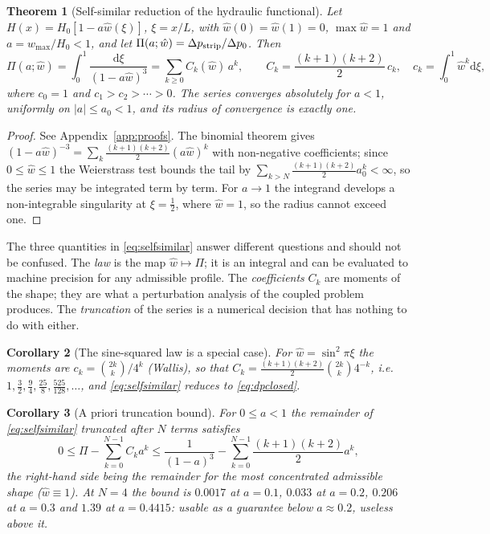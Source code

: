 \documentclass[11pt,a4paper]{article}
\newtheorem{theorem}{Theorem}[section]
\newtheorem{corollary}[theorem]{Corollary}
\newcommand{\dd}{\mathrm{d}}
\begin{document}
\begin{theorem}[Self-similar reduction of the hydraulic functional]
\label{thm:selfsimilar}
Let $H(x)=H_0[1-a\hat w(\xi)]$, $\xi=x/L$, with $\hat w(0)=\hat w(1)=0$, $\max\hat w=1$ and
$a=w_{\max}/H_0<1$, and let $\Pi(a;\hat w)=\Delta p_{\rm strip}/\Delta p_0$. Then
\begin{equation}
\Pi(a;\hat w)=\int_0^1\frac{\dd\xi}{(1-a\hat w)^3}
=\sum_{k\ge0}C_k(\hat w)\,a^k,\qquad
C_k=\frac{(k+1)(k+2)}{2}\,c_k,\quad c_k=\int_0^1\hat w^k\dd\xi ,
\label{eq:selfsimilar}
\end{equation}
where $c_0=1$ and $c_1>c_2>\cdots>0$. The series converges absolutely for $a<1$, uniformly
on $|a|\le a_0<1$, and its radius of convergence is exactly one.
\end{theorem}

\begin{proof}
See Appendix~\ref{app:proofs}. The binomial theorem gives
$(1-a\hat w)^{-3}=\sum_k\frac{(k+1)(k+2)}{2}(a\hat w)^k$ with non-negative coefficients;
since $0\le\hat w\le1$ the Weierstrass test bounds the tail by
$\sum_{k>N}\frac{(k+1)(k+2)}{2}a_0^k<\infty$, so the series may be integrated term by term.
For $a\to1$ the integrand develops a non-integrable singularity at $\xi=\tfrac12$, where
$\hat w=1$, so the radius cannot exceed one.
\end{proof}

The three quantities in \eqref{eq:selfsimilar} answer different questions and should not be
confused. The \emph{law} is the map $\hat w\mapsto\Pi$; it is an integral and can be evaluated
to machine precision for any admissible profile. The \emph{coefficients} $C_k$ are moments of
the shape; they are what a perturbation analysis of the coupled problem produces. The
\emph{truncation} of the series is a numerical decision that has nothing to do with either.

\begin{corollary}[The sine-squared law is a special case]
\label{cor:sinsquared}
For $\hat w=\sin^2\pi\xi$ the moments are $c_k=\binom{2k}{k}/4^k$ (Wallis), so that
$C_k=\frac{(k+1)(k+2)}{2}\binom{2k}{k}4^{-k}$, i.e. $1,\tfrac32,\tfrac94,\tfrac{25}{8},
\tfrac{525}{128},\dots$, and \eqref{eq:selfsimilar} reduces to \eqref{eq:dpclosed}.
\end{corollary}

\begin{corollary}[A priori truncation bound]
\label{cor:truncation}
For $0\le a<1$ the remainder of \eqref{eq:selfsimilar} truncated after $N$ terms satisfies
\begin{equation}
0\le\Pi-\sum_{k=0}^{N-1}C_ka^k\le\frac{1}{(1-a)^3}
-\sum_{k=0}^{N-1}\frac{(k+1)(k+2)}{2}a^k ,
\label{eq:truncbound}
\end{equation}
the right-hand side being the remainder for the most concentrated admissible shape
($\hat w\equiv1$). At $N=4$ the bound is $0.0017$ at $a=0.1$, $0.033$ at $a=0.2$, $0.206$ at
$a=0.3$ and $1.39$ at $a=0.4415$: usable as a guarantee below $a\approx0.2$, useless above it.
\end{corollary}
\end{document}
